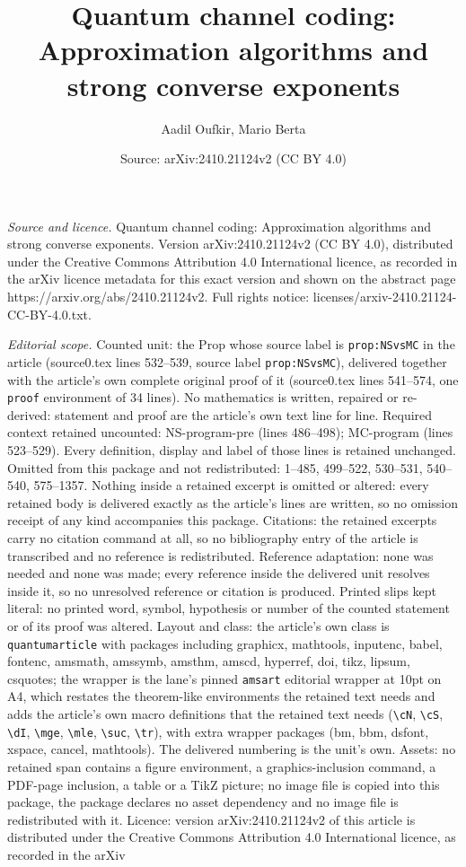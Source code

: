 \documentclass[10pt,a4paper]{amsart}
\title[Quantum channel coding: Approximation algorithms and strong ]{Quantum channel coding: Approximation algorithms and strong converse exponents}
\author{Aadil Oufkir, Mario Berta}
\date{Source: arXiv:2410.21124v2 (CC BY 4.0)}
\begin{document}
\maketitle

\noindent\emph{Source and licence.} Quantum channel coding: Approximation algorithms and strong converse exponents. Version arXiv:2410.21124v2 (CC BY 4.0), distributed under the Creative Commons Attribution 4.0 International licence, as recorded in the arXiv licence metadata for this exact version and shown on the abstract page https://arxiv.org/abs/2410.21124v2. Full rights notice: licenses/arxiv-2410.21124-CC-BY-4.0.txt.\par\smallskip

\noindent\textit{Editorial scope.} Counted unit: the Prop whose source label is \texttt{prop:NSvsMC} in the article (source0.tex lines 532--539, source label \texttt{prop:NSvsMC}), delivered together with the article's own complete original proof of it (source0.tex lines 541--574, one \texttt{proof} environment of 34 lines). No mathematics is written, repaired or re-derived: statement and proof are the article's own text line for line. Required context retained uncounted: NS-program-pre (lines 486--498); MC-program (lines 523--529). Every definition, display and label of those lines is retained unchanged. Omitted from this package and not redistributed: 1--485, 499--522, 530--531, 540--540, 575--1357. Nothing inside a retained excerpt is omitted or altered: every retained body is delivered exactly as the article's lines are written, so no omission receipt of any kind accompanies this package. Citations: the retained excerpts carry no citation command at all, so no bibliography entry of the article is transcribed and no reference is redistributed. Reference adaptation: none was needed and none was made; every reference inside the delivered unit resolves inside it, so no unresolved reference or citation is produced. Printed slips kept literal: no printed word, symbol, hypothesis or number of the counted statement or of its proof was altered. Layout and class: the article's own class is \texttt{quantumarticle} with packages including graphicx, mathtools, inputenc, babel, fontenc, amsmath, amssymb, amsthm, amscd, hyperref, doi, tikz, lipsum, csquotes; the wrapper is the lane's pinned \texttt{amsart} editorial wrapper at 10pt on A4, which restates the theorem-like environments the retained text needs and adds the article's own macro definitions that the retained text needs (\texttt{\textbackslash cN}, \texttt{\textbackslash cS}, \texttt{\textbackslash dI}, \texttt{\textbackslash mge}, \texttt{\textbackslash mle}, \texttt{\textbackslash suc}, \texttt{\textbackslash tr}), with extra wrapper packages (bm, bbm, dsfont, xspace, cancel, mathtools). The delivered numbering is the unit's own. Assets: no retained span contains a figure environment, a graphics-inclusion command, a PDF-page inclusion, a table or a TikZ picture; no image file is copied into this package, the package declares no asset dependency and no image file is redistributed with it. Licence: version arXiv:2410.21124v2 of this article is distributed under the Creative Commons Attribution 4.0 International licence, as recorded in the arXiv 
\end{document}
